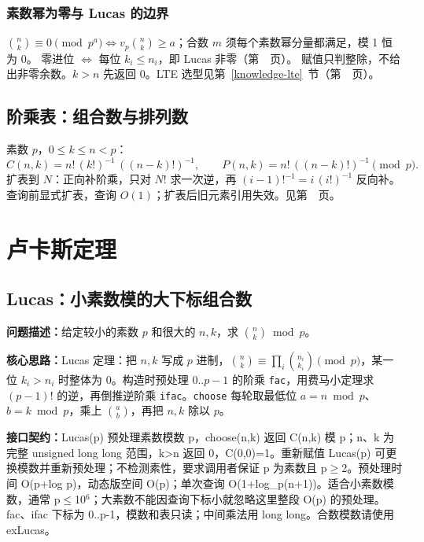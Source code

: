 \subsubsection{素数幂为零与 Lucas 的边界}
$\binom nk\equiv0\pmod{p^a}\Longleftrightarrow v_p\binom nk\ge a$；合数 $m$ 须每个素数幂分量都满足，模 1 恒为 0。
零进位 $\Longleftrightarrow$ 每位 $k_i\le n_i$，即 Lucas 非零（第~\pageref{compact-Lucas}~页）。
赋值只判整除，不给出非零余数。$k>n$ 先返回 0。LTE 选型见第~\ref{knowledge-lte}~节（第~\pageref{knowledge-lte}~页）。


\subsection{阶乘表：组合数与排列数}\label{knowledge-factorial-table}
素数 $p$，$0\le k\le n<p$：
\[
C(n,k)=n!\,(k!)^{-1}\,((n-k)!)^{-1},\qquad
P(n,k)=n!\,((n-k)!)^{-1}\pmod p.
\]
扩表到 $N$：正向补阶乘，只对 $N!$ 求一次逆，再 $(i-1)!^{-1}=i\,(i!)^{-1}$ 反向补。
查询前显式扩表，查询 $O(1)$；扩表后旧元素引用失效。见第~\pageref{compact-Binomial}~页。


\Needspace{660pt}

\section{卢卡斯定理}

\subsection{Lucas：小素数模的大下标组合数}\label{compact-Lucas}

\noindent\textbf{问题描述：}\allowbreak 给定较小的素数 $p$ 和很大的 $n,k$，求 $\binom nk\bmod p$。

\textbf{核心思路：}\allowbreak Lucas 定理：把 $n,k$ 写成 $p$ 进制，$\binom nk\equiv\prod_i\binom{n_i}{k_i}\pmod p$，某一位 $k_i>n_i$ 时整体为 0。构造时预处理 $0..p-1$ 的阶乘 \texttt{fac}，用费马小定理求 $(p-1)!$ 的逆，再倒推逆阶乘 \texttt{ifac}。\texttt{choose} 每轮取最低位 $a=n\bmod p$、$b=k\bmod p$，乘上 $\binom ab$，再把 $n,k$ 除以 $p$。



{\sloppy{}\noindent\textbf{接口契约：}Lucas(p) 预处理素数模数 p，choose(n,k) 返回 C(n,k) 模 p；n、k 为完整 unsigned long long 范围，k>n 返回 0，C(0,0)=1。重新赋值 Lucas(p) 可更换模数并重新预处理；不检测素性，要求调用者保证 p 为素数且 p$\ge$2。预处理时间 O(p+log p)，动态版空间 O(p)；单次查询 O(1+log\_p(n+1))。适合小素数模数，通常 p$\le$10$^{6}$；大素数不能因查询下标小就忽略这里整段 O(p) 的预处理。fac、ifac 下标为 0..p-1，模数和表只读；中间乘法用 long long。合数模数请使用 exLucas。\par}

